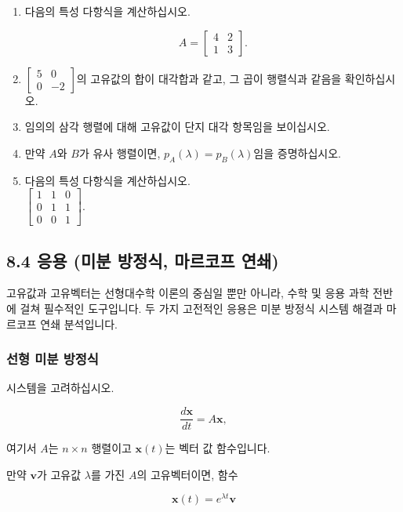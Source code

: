 \documentclass[
  12pt,
  a4paper,
]{article}
\begin{document}
\begin{enumerate}
\def\labelenumi{\arabic{enumi}.}
\item
  다음의 특성 다항식을 계산하십시오.

  \[A = \begin{bmatrix} 4 & 2 \\ 1 & 3 \end{bmatrix}.\]
\item
  \(\begin{bmatrix} 5 & 0 \\ 0 & -2 \end{bmatrix}\)의 고유값의 합이 대각합과 같고, 그 곱이 행렬식과 같음을 확인하십시오.
\item
  임의의 삼각 행렬에 대해 고유값이 단지 대각 항목임을 보이십시오.
\item
  만약 \(A\)와 \(B\)가 유사 행렬이면, \(p_A(\lambda) = p_B(\lambda)\)임을 증명하십시오.
\item
  다음의 특성 다항식을 계산하십시오.\\
  \(\begin{bmatrix} 1 & 1 & 0 \\ 0 & 1 & 1 \\ 0 & 0 & 1 \end{bmatrix}\).
\end{enumerate}

\subsection{8.4 응용 (미분 방정식, 마르코프 연쇄)}\label{84-applications-differential-equations-markov-chains}

고유값과 고유벡터는 선형대수학 이론의 중심일 뿐만 아니라, 수학 및 응용 과학 전반에 걸쳐 필수적인 도구입니다. 두 가지 고전적인 응용은 미분 방정식 시스템 해결과 마르코프 연쇄 분석입니다.

\subsubsection{선형 미분 방정식}\label{linear-differential-equations}

시스템을 고려하십시오.

\[\frac{d\mathbf{x}}{dt} = A \mathbf{x},\]

여기서 \(A\)는 \(n \times n\) 행렬이고 \(\mathbf{x}(t)\)는 벡터 값 함수입니다.

만약 \(\mathbf{v}\)가 고유값 \(\lambda\)를 가진 \(A\)의 고유벡터이면, 함수

\[\mathbf{x}(t) = e^{\lambda t}\mathbf{v}\]
\end{document}
